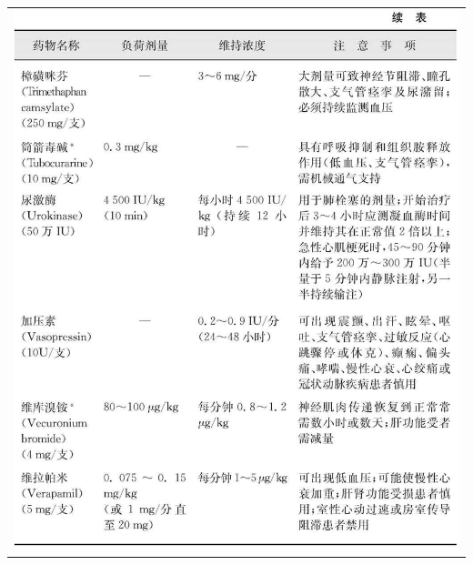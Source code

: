 \begin{longtable}{c}
\includegraphics[width=\textwidth,height=\textheight,keepaspectratio]{./images/Image00330.jpg}\\
\end{longtable}　



